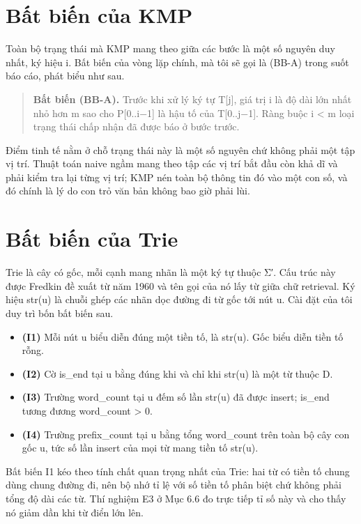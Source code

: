 \section{Bất biến của KMP}
\label{sec:2-3}

Toàn bộ trạng thái mà KMP mang theo giữa các bước là một số nguyên duy
nhất, ký hiệu i. Bất biến của vòng lặp chính, mà tôi sẽ gọi là (BB-A)
trong suốt báo cáo, phát biểu như sau.

\begin{quote}
\textbf{Bất biến (BB-A).} Trước khi xử lý ký tự T{[}j{]}, giá trị i là
độ dài lớn nhất nhỏ hơn m sao cho P{[}0..i−1{]} là hậu tố của
T{[}0..j−1{]}. Ràng buộc i \textless{} m loại trạng thái chấp nhận đã
được báo ở bước trước.
\end{quote}

Điểm tinh tế nằm ở chỗ trạng thái này là một số nguyên chứ không phải
một tập vị trí. Thuật toán naive ngầm mang theo tập các vị trí bắt đầu
còn khả dĩ và phải kiểm tra lại từng vị trí; KMP nén toàn bộ thông tin
đó vào một con số, và đó chính là lý do con trỏ văn bản không bao giờ
phải lùi.

\section{Bất biến của Trie}
\label{sec:2-4}

Trie là cây có gốc, mỗi cạnh mang nhãn là một ký tự thuộc Σ′. Cấu trúc
này được Fredkin đề xuất từ năm 1960 \cite{fredkin1960} và tên gọi của nó lấy từ
giữa chữ retrieval. Ký hiệu str(u) là chuỗi ghép các nhãn dọc đường đi
từ gốc tới nút u. Cài đặt của tôi duy trì bốn bất biến sau.

\begin{itemize}
\item
  \textbf{(I1)} Mỗi nút u biểu diễn đúng một tiền tố, là str(u). Gốc
  biểu diễn tiền tố rỗng.
\item
  \textbf{(I2)} Cờ is\_end tại u bằng đúng khi và chỉ khi str(u) là một
  từ thuộc D.
\item
  \textbf{(I3)} Trường word\_count tại u đếm số lần str(u) đã được
  insert; is\_end tương đương word\_count \textgreater{} 0.
\item
  \textbf{(I4)} Trường prefix\_count tại u bằng tổng word\_count trên
  toàn bộ cây con gốc u, tức số lần insert của mọi từ mang tiền tố
  str(u).
\end{itemize}

Bất biến I1 kéo theo tính chất quan trọng nhất của Trie: hai từ có tiền
tố chung dùng chung đường đi, nên bộ nhớ tỉ lệ với số tiền tố phân biệt
chứ không phải tổng độ dài các từ. Thí nghiệm E3 ở Mục 6.6 đo trực tiếp
tỉ số này và cho thấy nó giảm dần khi từ điển lớn lên.

